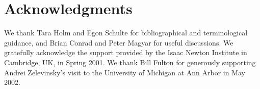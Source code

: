 \documentclass[letterpaper]{amsart}
\numberwithin{equation}{section}
\theoremstyle{definition}
\begin{document}
 
 
 
 
\section*{Acknowledgments} 
 
We thank Tara Holm and Egon Schulte for bibliographical and 
terminological guidance, 
and Brian Conrad and Peter Magyar for useful discussions. 
We gratefully acknowledge the support %
provided by the Isaac Newton Institute in Cambridge, UK, in Spring 
2001. 
We thank Bill Fulton for 
generously supporting Andrei Zelevinsky's visit to 
the University of Michigan at Ann Arbor in May 2002. 
 
 
 
\end{document}
